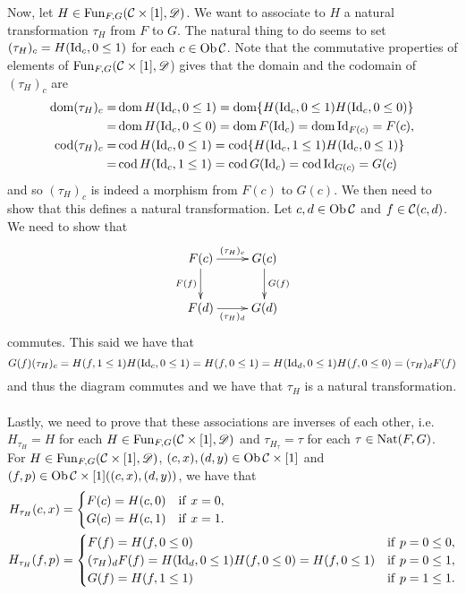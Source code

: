 \documentclass[11pt, a4paper, twoside]{article}
\begin{document}
Now, let $H\in\operatorname{Fun}_{F,G}(\mathcal{C}\times[1],\mathscr D)$. We want to associate to $H$ a natural transformation $\tau_H$ from $F$ to $G$. The natural thing to do seems to set $(\tau_H)_c=H(\mathrm{Id}_c,0\leq1)$ for each $c\in\operatorname{Ob}\mathcal{C}$. Note that the commutative properties of elements of $\operatorname{Fun}_{F,G}(\mathcal{C}\times[1],\mathscr D$) gives that the domain and the codomain of $(\tau_H)_c$ are 
	\begin{align*}
	\operatorname{dom}(\tau_H)_c =& \operatorname{dom} H(\mathrm{Id}_c,0\leq1) = \operatorname{dom} \{H(\mathrm{Id}_c,0\leq1)H(\mathrm{Id}_c,0\leq0)\} \\
				    =& \operatorname{dom} H(\mathrm{Id}_c,0\leq0) = \operatorname{dom} F(\mathrm{Id}_c) = \operatorname{dom}\mathrm{Id}_{F(c)} = F(c),\\
	\operatorname{cod}(\tau_H)_c =& \operatorname{cod} H(\mathrm{Id}_c,0\leq1) = \operatorname{cod} \{H(\mathrm{Id}_c,1\leq1)H(\mathrm{Id}_c,0\leq1)\}\\
				   =& \operatorname{cod} H(\mathrm{Id}_c,1\leq1) = \operatorname{cod} G(\mathrm{Id}_c) = \operatorname{cod}\mathrm{Id}_{G(c)} = G(c)
	\end{align*}
	and so $(\tau_H)_c$ is indeed a morphism from $F(c)$ to $G(c)$. We then need to show that this defines a natural transformation. Let $c,d\in\operatorname{Ob}\mathcal{C}$ and $f\in\mathcal{C}(c,d)$. We need to show that 
	\begin{displaymath}
		\xymatrix{
			F(c) \ar[r]^{(\tau_H)_c} \ar[d]_{F(f)} & G(c) \ar[d]^{G(f)}\\
			F(d) \ar[r]_{(\tau_H)_d} & G(d)
		}
	\end{displaymath}
commutes. This said we have that 
	\begin{displaymath}
		G(f)(\tau_H)_c=H(f,1\leq1)H(\mathrm{Id}_c,0\leq1)=H(f,0\leq1)=H(\mathrm{Id}_d,0\leq1)H(f,0\leq0)=(\tau_H)_dF(f)
	\end{displaymath} 
and thus the diagram commutes and we have that $\tau_H$ is a natural transformation.\\\\
Lastly, we need to prove that these associations are inverses of each other, i.e. $H_{\tau_H}=H$ for each $H\in\operatorname{Fun}_{F,G}(\mathcal{C}\times[1],\mathscr D)$ and $\tau_{H_\tau}=\tau$ for each $\tau\in\operatorname{Nat}(F,G)$. For $H\in\operatorname{Fun}_{F,G}(\mathcal{C}\times[1],\mathscr D)$, $(c,x),(d,y)\in\operatorname{Ob}\mathcal{C}\times[1]$ and $(f,p)\in\operatorname{Ob}\mathcal{C}\times[1]((c,x),(d,y))$, we have that 
	\begin{align*}
		H_{\tau_H}(c,x) &=
			\begin{cases}
				F(c)=H(c,0) & \mathrm{if}\ x=0,\\
				G(c)=H(c,1) & \mathrm{if}\ x=1.
			\end{cases}\\
		H_{\tau_H}(f,p) &=
			\begin{cases}
				F(f) = H(f,0\leq0) & \mathrm{if}\ p=0\leq0,\\
				(\tau_H)_dF(f)=H(\mathrm{Id}_d,0\leq1)H(f,0\leq0)=H(f,0\leq1) & \mathrm{if}\ p=0\leq1,\\
				G(f)  = H(f,1\leq1) & \mathrm{if}\ p=1\leq1.
			\end{cases}
		\end{align*}
\end{document}
